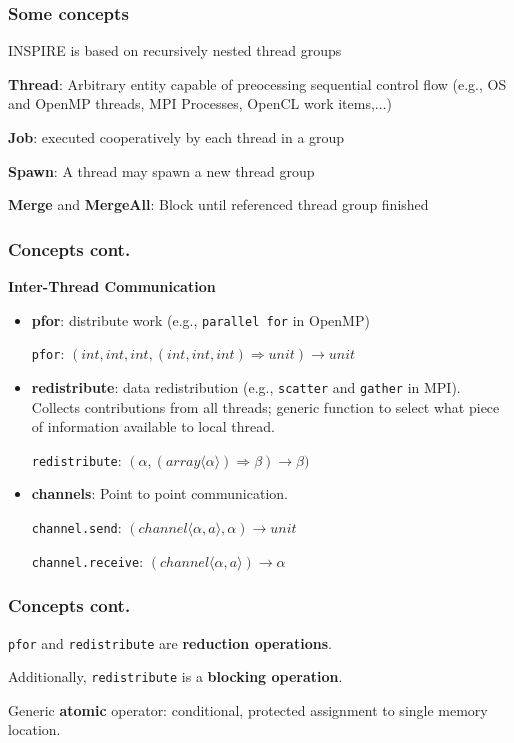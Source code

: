 \documentclass{beamer}
\newcommand\fB[1]{\textcolor{blue!80!black}{\textbf{#1}}}
\begin{document}
\begin{frame}
\frametitle{Some concepts}
INSPIRE is based on recursively nested thread groups

\bigskip
\fB{Thread}: Arbitrary entity capable of preocessing sequential control flow (e.g., OS and OpenMP threads, MPI Processes, OpenCL work items,...)

\bigskip
\fB{Job}: executed cooperatively by each thread in a group

\bigskip
\fB{Spawn}: A thread may spawn a new thread group

\bigskip
\fB{Merge} and \fB{MergeAll}: Block until referenced thread group finished 
\end{frame}

\begin{frame}
\frametitle{Concepts cont.}
\fB{Inter-Thread Communication}
\begin{itemize}
\item \fB{pfor}: distribute work (e.g., \texttt{parallel for} in OpenMP)

\texttt{pfor}: $(int,int,int,(int,int,int) \Rightarrow unit) \rightarrow unit $  

\bigskip\pause
\item \fB{redistribute}: data redistribution (e.g., \texttt{scatter} and \texttt{gather} in MPI). Collects contributions from all threads; generic function to select what piece of information available to local thread.

\texttt{redistribute}: $(\alpha, (array \langle\alpha\rangle) \Rightarrow \beta) \rightarrow \beta)$

\bigskip\pause
\item \fB{channels}: Point to point communication.

\texttt{channel.send}: $(channel\langle\alpha , a\rangle, \alpha) \rightarrow unit$

\texttt{channel.receive}: $(channel\langle\alpha, a\rangle) \rightarrow \alpha $

\end{itemize}

\end{frame}

\begin{frame}
\frametitle{Concepts cont.}
\texttt{pfor} and \texttt{redistribute} are \fB{reduction operations}. 

Additionally, \texttt{redistribute} is a \fB{blocking operation}.
\bigskip

Generic \fB{atomic} operator: conditional, protected assignment to single memory location.
\end{frame}
\end{document}
